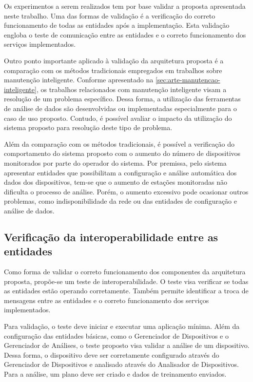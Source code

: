 Os experimentos a serem realizados tem por base validar a proposta apresentada neste trabalho. Uma
das formas de validação é a verificação do correto funcionamento de todas as entidades após a
implementação. Esta validação engloba o teste de comunicação entre as entidades e o correto
funcionamento dos serviços implementados.

Outro ponto importante aplicado à validação da arquitetura proposta é a comparação com os métodos
tradicionais empregados em trabalhos sobre manutenção inteligente. Conforme apresentado na
\cref{sec:arte-manutencao-inteligente}, os trabalhos relacionados com manutenção inteligente visam a
resolução de um problema específico. Dessa forma, a utilização das ferramentas de análise de dados
são desenvolvidas ou implementadas especialmente para o caso de uso proposto. Contudo, é possível
avaliar o impacto da utilização do sistema proposto para resolução deste tipo de problema.

Além da comparação com os métodos tradicionais, é possível a verificação do comportamento do sistema
proposto com o aumento do número de dispositivos monitorados por parte do operador do sistema. Por
premissa, pelo sistema apresentar entidades que possibilitam a configuração e análise automática dos
dados dos dispositivos, tem-se que o aumento de estações monitoradas não dificulta o processo de
análise. Porém, o aumento excessivo pode ocasionar outros problemas, como indisponibilidade da rede
ou das entidades de configuração e análise de dados.


\subsection{Verificação da interoperabilidade entre as entidades}
\label{sub:experimentos-interoperabilidade}

Como forma de validar o correto funcionamento dos componentes da arquitetura proposta, propõe-se um
teste de interoperabilidade. O teste visa verificar se todas as entidades estão operando
corretamente. Também permite identificar a troca de mensagens entre as entidades e o correto
funcionamento dos serviços implementados.

Para validação, o teste deve iniciar e executar uma aplicação mínima. Além da configuração das
entidades básicas, como o Gerenciador de Dispositivos e o Gerenciador de Análises, o teste proposto
visa validar a análise de um dispositivo. Dessa forma, o dispositivo deve ser corretamente
configurado através do Gerenciador de Dispositivos e analisado através do Analisador de
Dispositivos. Para a análise, um plano deve ser criado e dados de treinamento enviados.

